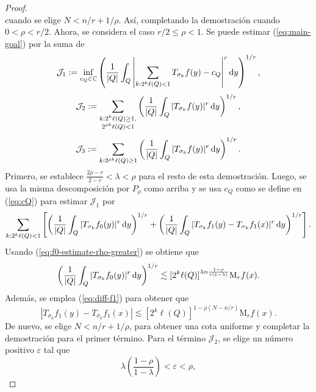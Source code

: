 \begin{proof}
\begin{equation*}
\end{equation*}
cuando se elige $N<n/r + 1/\rho$. Así, completando la demostración cuando $0<\rho<r/2 $. Ahora, se considera el caso $r/2\leq \rho<1$. Se puede estimar (\ref{eq:main-goal}) por la suma de 
\begin{equation*}
	\mathcal{J}_1 := \inf_{c_Q \in \mathbb{C}} \left( \frac{1}{|Q|}\int_Q \left| \sum_{k:2^k\ell(Q)<1} T_{\sigma_k} f(y) - c_Q \right|^r \mathop{}\!\mathrm{d} y
	\right)^{1/r},
\end{equation*}
\begin{equation*}
	\mathcal{J}_2 := \sum_{\substack{k:2^k\ell(Q)\geq 1, \\ 2^{\rho k}\ell(Q) <1}} \left(\frac{1}{|Q|} \int_Q |T_{\sigma_k}f(y)|^r \mathop{}\!\mathrm{d} y 
	\right)^{1/r},
\end{equation*}
\begin{equation*}
	\mathcal{J}_3 := \sum_{k:2^{\rho k} \ell(Q) \geq 1} \left( \frac{1}{|Q|} \int_Q |T_{\sigma_k}f(y)|^r \mathop{}\!\mathrm{d} y 
	\right)^{1/r}.
\end{equation*}
Primero, se establece $\frac{2\rho - r}{2-r} < \lambda < \rho$ para el resto de esta demostración. Luego, se usa la misma descomposición por $P_\rho$ como arriba y se usa $c_Q$ como se define en (\ref{eq:cQ}) para estimar $\mathcal{J}_1$ por
\begin{equation*}
	\sum_{k:2^k\ell(Q)<1} \left[
	\left(  \frac{1}{|Q|} \int_Q |T_{\sigma_k} f_0 (y)|^r \mathop{}\!\mathrm{d} y
	\right)^{1/r} + \left( \frac{1}{|Q|}\int_Q|T_{\sigma_k} f_1(y) -T_{\sigma_k}f_1(x)|^r \mathop{}\!\mathrm{d} y
	\right)^{1/r}
	\right].
\end{equation*}
Usando (\ref{eq:f0-estimate-rho-greater}) se obtiene que 
\begin{equation*}
	\left( 
	\frac{1}{|Q|} \int_Q |T_{\sigma_k} f_0 (y)|^r \mathop{}\!\mathrm{d} y
	\right)^{1/r} \lesssim [2^k\ell(Q)]^{\lambda n \frac{1-\rho}{r(1-\lambda)}} \mathrm{M}_rf(x).
\end{equation*}
Además, se emplea (\ref{eq:diff-f1}) para obtener que
\begin{equation*}
	|T_{\sigma_k} f_1(y) - T_{\sigma_k} f_1(x)| \lesssim [2^k\ell(Q)]^{1-\rho(N-n/r)} \mathrm{M}_rf(x).
\end{equation*}
De nuevo, se elige $N < n/r + 1/\rho$, para obtener una cota uniforme y completar la demostración para el primer término. Para el término $\mathcal{J}_2$, se elige un número positivo $\varepsilon$ tal que 
\begin{equation*}
	\lambda \left( \frac{1-\rho}{1-\lambda} \right) < \varepsilon < \rho,
\end{equation*}

\end{proof}
